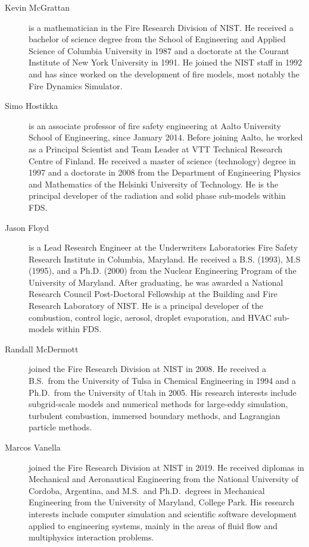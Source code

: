 \begin{description}

\item[Kevin McGrattan] is a mathematician in the Fire Research Division of NIST. He received a bachelor of science degree from the School of Engineering and Applied Science of Columbia University in 1987 and a doctorate at the Courant Institute of New York University in 1991. He joined the NIST staff in 1992 and has since worked on the development of fire models, most notably the Fire Dynamics Simulator.

\item[Simo Hostikka] is an associate professor of fire safety engineering at Aalto University School of Engineering, since January 2014. Before joining Aalto, he worked as a Principal Scientist and Team Leader at VTT Technical Research Centre of Finland. He received a master of science (technology) degree in 1997 and a doctorate in 2008 from the Department of Engineering Physics and Mathematics of the Helsinki University of Technology.  He is the principal developer of the radiation and solid phase sub-models within FDS.

\item[Jason Floyd] is a Lead Research Engineer at the Underwriters Laboratories Fire Safety Research Institute in Columbia, Maryland. He received a B.S. (1993), M.S (1995), and a Ph.D. (2000) from the Nuclear Engineering Program of the University of Maryland. After graduating, he was awarded a National Research Council Post-Doctoral Fellowship at the Building and Fire Research Laboratory of NIST. He is a principal developer of the combustion, control logic, aerosol, droplet evaporation, and HVAC sub-models within FDS.

\item[Randall McDermott] joined the Fire Research Division at NIST in 2008. He received a B.S.~from the University of Tulsa in Chemical Engineering in 1994 and a Ph.D.~from the University of Utah in 2005. His research interests include subgrid-scale models and numerical methods for large-eddy simulation, turbulent combustion, immersed boundary methods, and Lagrangian particle methods.

\item[Marcos Vanella] joined the Fire Research Division at NIST in 2019. He received diplomas in Mechanical and Aeronautical Engineering from the National University of Cordoba, Argentina, and M.S.~and Ph.D.~degrees in Mechanical Engineering from the University of Maryland, College Park. His research interests include computer simulation and scientific software development applied to engineering systems, mainly in the areas of fluid flow and multiphysics interaction problems.


\end{description}
